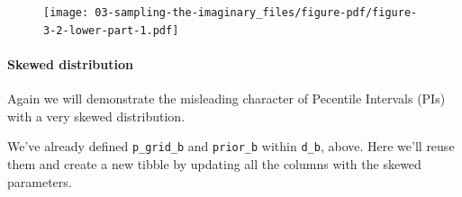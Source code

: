 \documentclass[
  letterpaper,
  DIV=11,
  numbers=noendperiod]{scrreprt}
\let\oldparagraph\paragraph
\renewcommand{\paragraph}[1]{\oldparagraph{#1}\mbox{}}
\begin{document}
\begin{figure}[H]

{\centering \texttt{[image: 03-sampling-the-imaginary\_files/figure-pdf/figure-3-2-lower-part-1.pdf]}

}

\end{figure}

\hypertarget{skewed-distribution-1}{%
\paragraph{Skewed distribution}\label{skewed-distribution-1}}

Again we will demonstrate the misleading character of Pecentile
Intervals (PIs) with a very skewed distribution.

We've already defined \texttt{p\_grid\_b} and \texttt{prior\_b} within
\texttt{d\_b}, above. Here we'll reuse them and create a new tibble by
updating all the columns with the skewed parameters.
\end{document}
